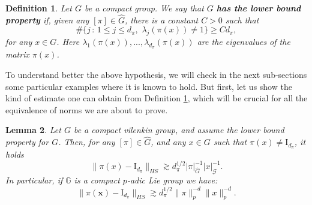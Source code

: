 \documentclass[12pt, reqno]{amsart}
\newtheorem{defi}{Definition}[section]
\newtheorem{lema}[defi]{Lemma}
\newcommand{\1}{\mathds{1}}
\newcommand{\G}{\mathbb{G}}
\begin{document}
\begin{defi}\label{defiLowerBound}
    Let $G$ be a compact group. We say that $G$ \textbf{\emph{has the lower bound property}} if, given any $[\pi] \in \widehat{G}$, there is a constant $C>0$ such that $$\# \{ j \, : \, 1 \leq j \leq d_\pi, \,\, \lambda_j (\pi(x)) \neq 1 \} \geq C d_\pi, $$for any $x \in G$. Here $\lambda_1 (\pi(x)), ..., \lambda_{d_\pi} (\pi(x))$ are the eigenvalues of the matrix $\pi(x)$.
\end{defi}

To understand better the above hypothesis, we will check in the next sub-sections some particular examples where it is known to hold. But first, let us show the kind of estimate one can obtain from Definition \ref{defiLowerBound}, which will be crucial for all the equivalence of norms we are about to prove. 


\begin{lema}\label{lemaLowerBoundVilenkin}
    Let $G$ be a compact vilenkin group, and assume the lower bound property for $G$. Then, for any $[\pi] \in \widehat{G}$, and any $x \in G$ such that $\pi(x) \neq \mathrm{I}_{d_\pi}$, it holds \[
\|\pi(x) - \mathrm{I}_{d_\pi} \|_{HS} \gtrsim d_\pi^{1/2} |\pi|_{\widehat{G}}^{-1} |x|_{\mathcal{G}}^{-1}.
\]In particular, if $\G$ is a compact $p$-adic Lie group we have: \[
\|\pi(\mathbf{x}) - \mathrm{I}_{d_\pi} \|_{HS} \gtrsim d_\pi^{1/2} \|\pi\|^{-d}_p \|x\|^{-d}_p.
\]
\end{lema}
\end{document}
